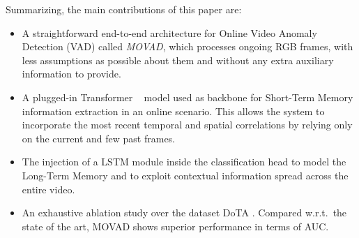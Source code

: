 Summarizing, the main contributions of this paper are:
\begin{itemize}%
    \item A straightforward end-to-end architecture for Online Video Anomaly Detection (VAD) called \emph{MOVAD}, which processes ongoing RGB frames, with less assumptions as possible about them and without any extra auxiliary information to provide.
    \item A plugged-in Transformer ~\cite{liu_video_2022} model used as backbone for Short-Term Memory information extraction in an online scenario.
    This allows the system to incorporate the most recent temporal and spatial correlations by relying only on the current and few past frames.
    \item The injection of a LSTM module inside the classification head to model the Long-Term Memory and to exploit contextual information spread across the entire video.
    \item An exhaustive ablation study over the dataset DoTA \cite{9712446}.
    Compared w.r.t.~the state of the art, MOVAD shows superior performance in terms of AUC.
\end{itemize}